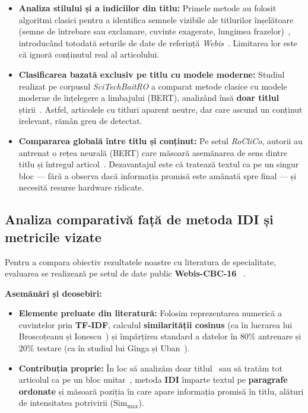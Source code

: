 \documentclass[12pt, a4paper]{article}
\begin{document}
\begin{itemize}
    \item \textbf{Analiza stilului și a indiciilor din titlu:} Primele metode au folosit algoritmi clasici pentru a identifica semnele vizibile ale titlurilor înșelătoare (semne de întrebare sau exclamare, cuvinte exagerate, lungimea frazelor)~\cite{potthast2016, indurthi2020, vincze2020}, introducând totodată seturile de date de referință \textit{Webis}~\cite{potthast2016}. Limitarea lor este că ignoră conținutul real al articolului.
    \item \textbf{Clasificarea bazată exclusiv pe titlu cu modele moderne:} Studiul realizat pe corpusul \textit{SciTechBaitRO} a comparat metode clasice cu modele moderne de înțelegere a limbajului (BERT), analizând însă \textbf{doar titlul} știrii~\cite{ginga2024}. Astfel, articolele cu titluri aparent neutre, dar care ascund un conținut irelevant, rămân greu de detectat.
    \item \textbf{Compararea globală între titlu și conținut:} Pe setul \textit{RoCliCo}, autorii au antrenat o rețea neurală (BERT) care măsoară asemănarea de sens dintre titlu și întregul articol~\cite{broscoteanu2023}. Dezavantajul este că tratează textul ca pe un singur bloc — fără a observa dacă informația promisă este amânată spre final — și necesită resurse hardware ridicate.
\end{itemize}

\subsection{Analiza comparativă față de metoda IDI și metricile vizate}

Pentru a compara obiectiv rezultatele noastre cu literatura de specialitate, evaluarea se realizează pe setul de date public \textbf{Webis-CBC-16} ~\cite{potthast2016}.

\textbf{Asemănări și deosebiri:}
\begin{itemize}
    \item \textbf{Elemente preluate din literatură:} Folosim reprezentarea numerică a cuvintelor prin \textbf{TF-IDF}, calculul \textbf{similarității cosinus} (ca în lucrarea lui Broscoțeanu și Ionescu~\cite{broscoteanu2023}) și împărțirea standard a datelor în $80\%$ antrenare și $20\%$ testare (ca în studiul lui Gînga și Uban~\cite{ginga2024}).
    \item \textbf{Contribuția proprie:} În loc să analizăm doar titlul~\cite{ginga2024} sau să tratăm tot articolul ca pe un bloc unitar~\cite{broscoteanu2023}, metoda \textbf{IDI} împarte textul pe \textbf{paragrafe ordonate} și măsoară poziția în care apare informația promisă în titlu, alături de intensitatea potrivirii ($\text{Sim}_{\max}$).
\end{itemize}
\end{document}
